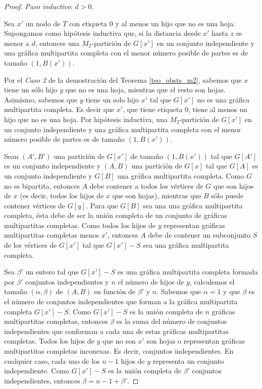 \begin{proof}
\emph{Paso inductivo}: $d > 0$.

Sea $x'$ un nodo de $T$ con etiqueta 0 y al menos un hijo que no es una hoja. Supongamos como hipótesis inductiva que, si la distancia desde $x'$ hasta $z$ es menor a $d$, entonces una $M_2$-partición de $G[x']$ en un conjunto independiente y una gráfica multipartita completa con el menor número posible de partes es de tamaño $(1,B(x'))$.

Por el \emph{Caso 2} de la demostración del Teorema \ref{teo_obsts_m2}, sabemos que $x$ tiene un sólo hijo $y$ que no es una hoja, mientras que el resto son hojas. Asimismo, sabemos que $y$ tiene un solo hijo $x'$ tal que $G[x']$ no es una gráfica multipartita completa. Es decir que $x'$, que tiene etiqueta 0, tiene al menos un hijo que no es una hoja. Por hip\'otesis inductiva, una $M_2$-partición de $G[x']$ en un conjunto independiente y una gráfica multipartita completa con el menor número posible de partes es de tamaño $(1,B(x'))$.

Sean $(A',B')$ una partición de $G[x']$ de tamaño $(1,B(x'))$ tal que $G[A']$ es un conjunto independiente y $(A,B)$ una partición de $G[x]$ tal que $G[A]$ es un conjunto independiente y $G[B]$ una gráfica multipartita completa. Como $G$ no es bipartita, entonces $A$ debe contener a todos los vértices de $G$ que son hijos de $x$ (es decir, todos los hijos de $x$ que son hojas), mientras que $B$ sólo puede contener vértices de $G[y]$. Para que $G[B]$ sea una una gráfica multipartita completa, ésta debe de ser la unión completa de un conjunto de gráficas multipartitas completas. Como todos los hijos de $y$ representan gráficas multipartitas completas menos $x'$, entonces $A$ debe de contener un subconjunto $S$ de los vértices de $G[x']$ tal que $G[x']-S$ sea una gráfica multipartita completa.

Sea $\beta'$ un entero tal que $G[x']-S$ es una gráfica multipartita completa
formada por $\beta'$ conjuntos independientes y $n$ el número de hijos de $y$,
calculemos el tamaño $(\alpha,\beta)$ de $(A,B)$ en función de $\beta'$ y $n$.
Sabemos que $\alpha=1$ y que $\beta$ es el número de conjuntos independientes que
forman a la gráfica multipartita completa $G[x']-S$. Como $G[x']-S$ es la unión
completa de $n$ gráficas multipartitas completas, entonces $\beta$ es la suma del
número de conjuntos independientes que conforman a cada una de estas gráficas
multipartitas completas. Todos los hijos de $y$ que no son $x'$ son hojas o
representan gráficas multipartitas completas inconexas. Es decir, conjuntos independientes. En cualquier caso, cada uno de los $n-1$ hijos de $y$ representa un conjunto independiente. Como $G[x']-S$ es la unión completa de $\beta'$ conjuntos independientes, entonces $\beta = n-1+\beta'$.


\end{proof}
